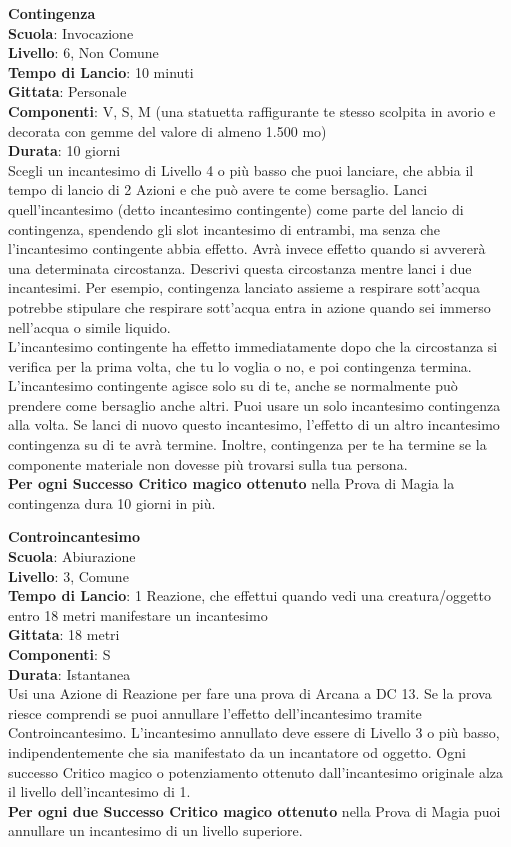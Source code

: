 \begin{multicols}{2}
\medskip\textbf{Contingenza}\\
\textbf{Scuola}: Invocazione\\
\textbf{Livello}: 6, Non Comune\\
\textbf{Tempo di Lancio}: 10 minuti\\
\textbf{Gittata}: Personale\\
\textbf{Componenti}: V, S, M (una statuetta raffigurante te stesso scolpita in avorio e decorata con gemme del valore di almeno 1.500 mo)\\
\textbf{Durata}: 10 giorni\\
Scegli un incantesimo di Livello 4 o più basso che puoi lanciare, che abbia il tempo di lancio di 2 Azioni e che può avere te come bersaglio. Lanci quell'incantesimo (detto incantesimo contingente) come parte del lancio di contingenza, spendendo gli slot incantesimo di entrambi, ma senza che l'incantesimo contingente abbia effetto. Avrà invece effetto quando si avvererà una determinata circostanza. Descrivi questa circostanza mentre lanci i due incantesimi. Per esempio, contingenza lanciato assieme a respirare sott'acqua potrebbe stipulare che respirare sott'acqua entra in azione quando sei immerso nell'acqua o simile liquido.\\
L'incantesimo contingente ha effetto immediatamente dopo che la circostanza si verifica per la prima volta, che tu lo voglia o no, e poi contingenza termina. L'incantesimo contingente agisce solo su di te, anche se normalmente può prendere come bersaglio anche altri. Puoi usare un solo incantesimo contingenza alla volta. Se lanci di nuovo questo incantesimo, l'effetto di un altro incantesimo contingenza su di te avrà termine. Inoltre, contingenza per te ha termine se la componente materiale non dovesse più trovarsi sulla tua persona.\\
\textbf{Per ogni Successo Critico magico ottenuto} nella Prova di Magia la contingenza dura 10 giorni in più.

\medskip\textbf{Controincantesimo}\\
\textbf{Scuola}: Abiurazione\\
\textbf{Livello}: 3, Comune\\
\textbf{Tempo di Lancio}: 1 Reazione, che effettui quando vedi una creatura/oggetto entro 18 metri manifestare un incantesimo\\
\textbf{Gittata}: 18 metri\\
\textbf{Componenti}: S \\
\textbf{Durata}: Istantanea\\
Usi una Azione di Reazione per fare una prova di Arcana a DC 13. Se la prova riesce comprendi se puoi annullare l'effetto dell'incantesimo tramite Controincantesimo. L'incantesimo annullato deve essere di Livello 3 o più basso, indipendentemente che sia manifestato da un incantatore od oggetto. Ogni successo Critico magico o potenziamento ottenuto dall'incantesimo originale alza il livello dell'incantesimo di 1.\\
\textbf{Per ogni due Successo Critico magico ottenuto} nella Prova di Magia puoi annullare un incantesimo di un livello superiore.


\end{multicols}
